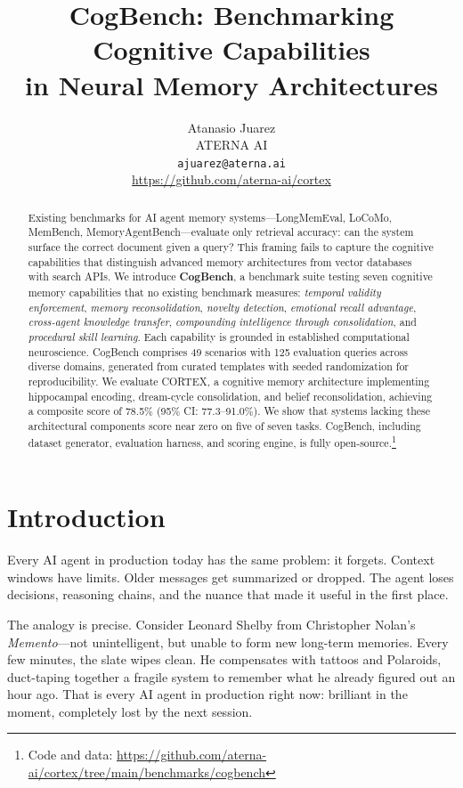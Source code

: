 \documentclass{article}
\title{CogBench: Benchmarking Cognitive Capabilities \\ in Neural Memory Architectures}
\author{
  Atanasio Juarez \\
  ATERNA AI \\
  \texttt{ajuarez@aterna.ai} \\
  \url{https://github.com/aterna-ai/cortex}
}
\date{}
\begin{document}
\maketitle

\begin{abstract}
Existing benchmarks for AI agent memory systems---LongMemEval, LoCoMo, MemBench, MemoryAgentBench---evaluate only retrieval accuracy: can the system surface the correct document given a query? This framing fails to capture the cognitive capabilities that distinguish advanced memory architectures from vector databases with search APIs. We introduce \textbf{CogBench}, a benchmark suite testing seven cognitive memory capabilities that no existing benchmark measures: \emph{temporal validity enforcement}, \emph{memory reconsolidation}, \emph{novelty detection}, \emph{emotional recall advantage}, \emph{cross-agent knowledge transfer}, \emph{compounding intelligence through consolidation}, and \emph{procedural skill learning}. Each capability is grounded in established computational neuroscience. CogBench comprises 49 scenarios with 125 evaluation queries across diverse domains, generated from curated templates with seeded randomization for reproducibility. We evaluate CORTEX, a cognitive memory architecture implementing hippocampal encoding, dream-cycle consolidation, and belief reconsolidation, achieving a composite score of 78.5\% (95\% CI: 77.3--91.0\%). We show that systems lacking these architectural components score near zero on five of seven tasks. CogBench, including dataset generator, evaluation harness, and scoring engine, is fully open-source.\footnote{Code and data: \url{https://github.com/aterna-ai/cortex/tree/main/benchmarks/cogbench}}
\end{abstract}

\section{Introduction}
\label{sec:intro}

Every AI agent in production today has the same problem: it forgets. Context windows have limits. Older messages get summarized or dropped. The agent loses decisions, reasoning chains, and the nuance that made it useful in the first place.

The analogy is precise. Consider Leonard Shelby from Christopher Nolan's \emph{Memento}---not unintelligent, but unable to form new long-term memories. Every few minutes, the slate wipes clean. He compensates with tattoos and Polaroids, duct-taping together a fragile system to remember what he already figured out an hour ago. That is every AI agent in production right now: brilliant in the moment, completely lost by the next session.
\end{document}
